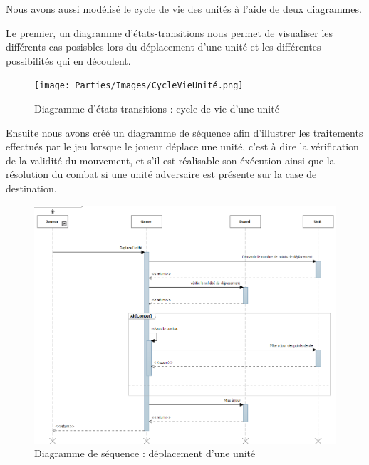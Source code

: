 Nous avons aussi modélisé le cycle de vie des unités à l'aide de deux diagrammes.

Le premier, un diagramme d'états-transitions nous permet de visualiser les différents cas posisbles lors du déplacement d'une unité et les différentes possibilités qui en découlent.
\begin{figure}[!h]
\centering
\texttt{[image: Parties/Images/CycleVieUnité.png]}
\caption{Diagramme d'états-transitions : cycle de vie d'une unité}
\label{fig:CycleVieUnité}
\end{figure}

\newpage
Ensuite nous avons créé un diagramme de séquence afin d'illustrer les traitements effectués par le jeu lorsque le joueur déplace une unité, c'est à dire la vérification de la validité du mouvement, et s'il est réalisable son éxécution ainsi que la résolution du combat si une unité adversaire est présente sur la case de destination.
\begin{figure}[!h]
\centering
\includegraphics[width=\textwidth]{Parties/Images/seq_DeplacementUnite.png}
\caption{Diagramme de séquence : déplacement d'une unité}
\label{fig:seq_DeplacementUnite}
\end{figure}
